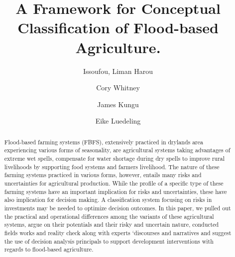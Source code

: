 \documentclass[]{elsarticle} %
\begin{document}
\begin{frontmatter}

  \title{A Framework for Conceptual Classification of Flood-based Agriculture.}
    \author[KU,ICRAF]{Issoufou, Liman Harou}
    \author[INRES]{Cory Whitney}
    \author[KU]{James Kungu}
    \author[INRES]{Eike Luedeling}
      \address[KU]{Kenyatta University, Department of Environmental Sciences, P.O. Box 43844 00100 Nairobi, Kenya}
    \address[ICRAF]{World Agroforestry Centre (ICRAF), United Nations Avenue, Gigiri, P.O. Box 30677-00100, Nairobi, Kenya}
    \address[INRES]{University of Bonn, Department of Horticultural Sciences, Auf dem Hügel 6, D-53121, Bonn, Germany}
    \address[ZEF]{Center for Development research (ZEF), University of Bonn, Genscherallee 3, D-53113, Bonn, Germany}
    
  \begin{abstract}
  Flood-based farming systems (FBFS), extensively practiced in drylands area experiencing various forms of seasonality, are agricultural systems taking advantages of extreme wet spells, compensate for water shortage during dry spells to improve rural livelihoods by supporting food systems and farmers livelihood. The nature of these farming systems practiced in various forms, however, entails many risks and uncertainties for agricultural production. While the profile of a specific type of these farming systems have an important implication for risks and uncertainties, these have also implication for decision making. A classification system focusing on risks in investments may be needed to optimize decision outcomes. In this paper, we pulled out the practical and operational differences among the variants of these agricultural systems, argue on their potentials and their risky and uncertain nature, conducted fields works and reality check along with experts `discourses and narratives and suggest the use of decision analysis principals to support development interventions with regards to flood-based agriculture.
  \end{abstract}
  
 \end{frontmatter}
\end{document}
